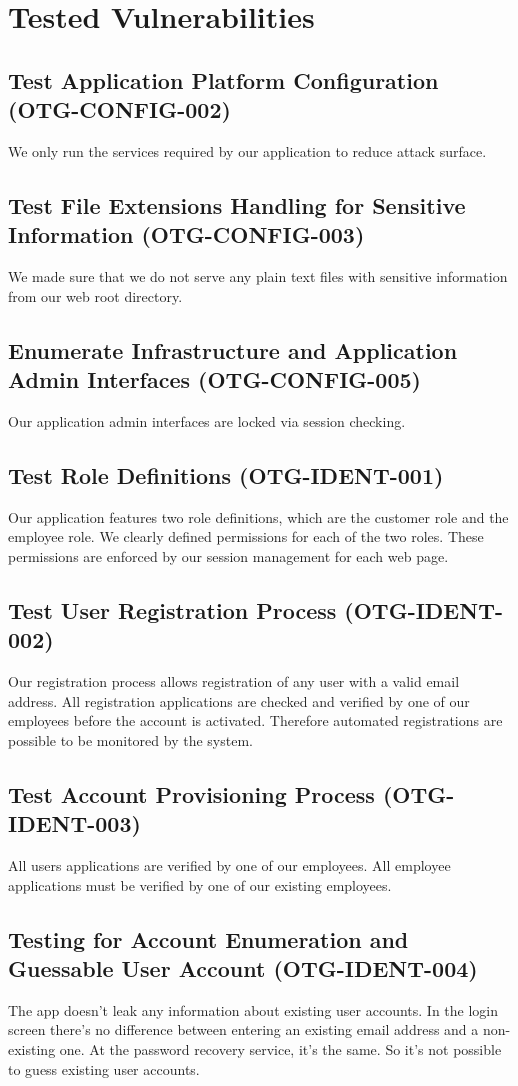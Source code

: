 \chapter{Tested Vulnerabilities}
\section{Test Application Platform Configuration (OTG-CONFIG-002)}
We only run the services required by our application to reduce attack surface.
\section{Test File Extensions Handling for Sensitive Information (OTG-CONFIG-003)}
We made sure that we do not serve any plain text files with sensitive information from our web root directory.
\section{Enumerate Infrastructure and Application Admin Interfaces (OTG-CONFIG-005)}
Our application admin interfaces are locked via session checking.
\section{Test Role Definitions (OTG-IDENT-001)}
Our application features two role definitions, which are the customer role and the employee role.
We clearly defined permissions for each of the two roles. These permissions are enforced by our session management for each web page.
\section{Test User Registration Process (OTG-IDENT-002)}
Our registration process allows registration of any user with a valid email address. All registration applications are checked and verified by one of our employees before the account is activated. Therefore automated registrations are possible to be monitored by the system.

\section{Test Account Provisioning Process (OTG-IDENT-003)}
All users applications are verified by one of our employees. All employee applications must be verified by one of our existing employees.

\section{Testing for Account Enumeration and Guessable User Account (OTG-IDENT-004)}
The app doesn't leak any information about existing user accounts. 
In the login screen there's no difference between entering an existing email address and a non-existing one.
At the password recovery service, it's the same. So it's not possible to guess existing user accounts.

